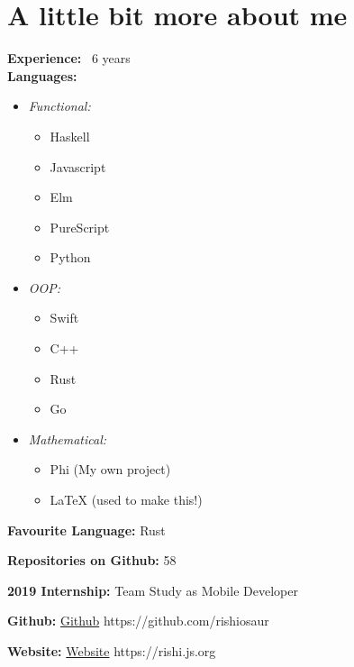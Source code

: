 \documentclass[]{report}
\begin{document}
\chapter{A little bit more about me}
\textbf{Experience: } ~6 years
\\
\textbf{Languages: }
\begin{itemize}
    \item \textit{Functional:}
    \begin{itemize}
        \item Haskell
        \item Javascript
        \item Elm
        \item PureScript
        \item Python
    \end{itemize}
    \item \textit{OOP:}
    \begin{itemize}
        \item Swift
        \item C++
        \item Rust
        \item Go
    \end{itemize}
    \item \textit{Mathematical:}
    \begin{itemize}
        \item Phi (My own project)
        \item LaTeX (used to make this!)
    \end{itemize}
\end{itemize}

\textbf{Favourite Language: } Rust

\textbf{Repositories on Github: } 58

\textbf{2019 Internship: } Team Study as Mobile Developer

\textbf{Github: } \href{https://github.com/rishiosaur}{Github} https://github.com/rishiosaur

\textbf{Website: } \href{https://rishi.js.org}{Website} https://rishi.js.org
\end{document}

